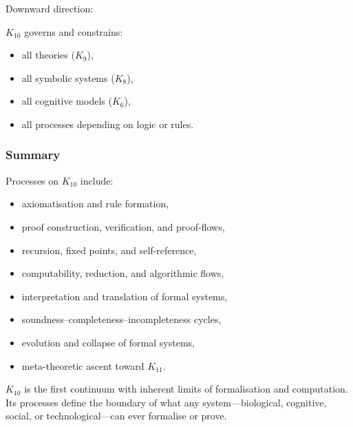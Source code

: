 Downward direction:

$K_{10}$ governs and constrains:
\begin{itemize}
    \item all theories ($K_9$),
    \item all symbolic systems ($K_8$),
    \item all cognitive models ($K_6$),
    \item all processes depending on logic or rules.
\end{itemize}

\subsubsection{Summary}

Processes on $K_{10}$ include:
\begin{itemize}
    \item axiomatisation and rule formation,
    \item proof construction, verification, and proof-flows,
    \item recursion, fixed points, and self-reference,
    \item computability, reduction, and algorithmic flows,
    \item interpretation and translation of formal systems,
    \item soundness–completeness–incompleteness cycles,
    \item evolution and collapse of formal systems,
    \item meta-theoretic ascent toward $K_{11}$.
\end{itemize}

$K_{10}$ is the first continuum with inherent
limits of formalisation and computation.
Its processes define the boundary of what any system—biological,
cognitive, social, or technological—can ever formalise or prove.
